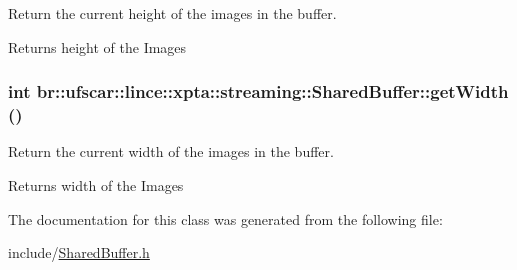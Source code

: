 Return the current height of the images in the buffer. 

\begin{DoxyReturn}{Returns}
height of the Images 
\end{DoxyReturn}
\hypertarget{classbr_1_1ufscar_1_1lince_1_1xpta_1_1streaming_1_1SharedBuffer_a9c0ce5c3d3e2f7ee24c0847d3a11bec5}{
\subsubsection[{getWidth}]{\setlength{\rightskip}{0pt plus 5cm}int br::ufscar::lince::xpta::streaming::SharedBuffer::getWidth ()}}
\label{classbr_1_1ufscar_1_1lince_1_1xpta_1_1streaming_1_1SharedBuffer_a9c0ce5c3d3e2f7ee24c0847d3a11bec5}


Return the current width of the images in the buffer. 

\begin{DoxyReturn}{Returns}
width of the Images 
\end{DoxyReturn}


The documentation for this class was generated from the following file:\begin{DoxyCompactItemize}
\item 
include/\hyperlink{SharedBuffer_8h}{SharedBuffer.h}\end{DoxyCompactItemize}
